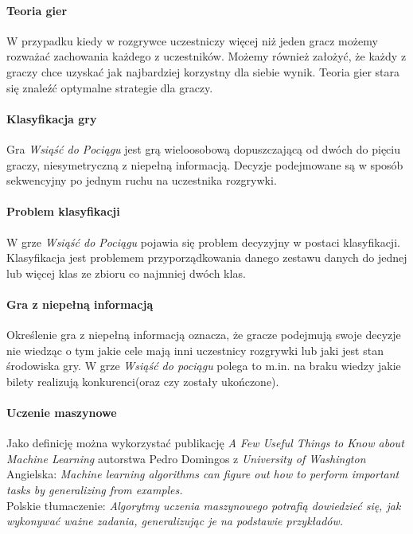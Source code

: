 \documentclass[12pt, oneside]{report}
\begin{document}
\paragraph{Teoria gier} W przypadku kiedy w rozgrywce uczestniczy więcej niż jeden gracz możemy rozważać zachowania każdego z uczestników. Możemy również założyć, że każdy z graczy chce uzyskać jak najbardziej korzystny dla siebie wynik. Teoria gier stara się znaleźć optymalne strategie dla graczy.
\paragraph{Klasyfikacja gry}
Gra \textit{Wsiąść do Pociągu} jest grą wieloosobową dopuszczającą od dwóch do pięciu graczy, niesymetryczną z niepełną informacją. Decyzje podejmowane są w sposób sekwencyjny po jednym ruchu na uczestnika rozgrywki.
\paragraph{Problem klasyfikacji}
W grze \textit{Wsiąść do Pociągu} pojawia się problem decyzyjny w postaci klasyfikacji. Klasyfikacja jest problemem przyporządkowania danego zestawu danych do jednej lub więcej klas ze zbioru co najmniej dwóch klas.
\paragraph{Gra z niepełną informacją} 
Określenie gra z niepełną informacją oznacza, że gracze podejmują swoje decyzje nie wiedząc o tym jakie cele mają inni uczestnicy rozgrywki lub jaki jest stan środowiska gry. W grze \textit{Wsiąść do pociągu} polega to m.in. na braku wiedzy jakie bilety realizują konkurenci(oraz czy zostały ukończone).

\paragraph{Uczenie maszynowe} Jako definicję można wykorzystać publikację \textit{A Few Useful Things to Know about Machine Learning} autorstwa Pedro Domingos z \textit{University of Washington} \\
Angielska:  \textit{Machine learning algorithms can figure out how to perform important tasks by generalizing from examples.} \\
Polskie tłumaczenie: \textit{Algorytmy uczenia maszynowego potrafią dowiedzieć się, jak wykonywać ważne zadania, generalizując je na podstawie przykładów.} \\
\end{document}
